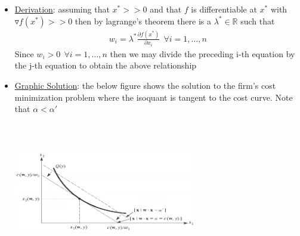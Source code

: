 \documentclass{article}
\begin{document}
  \begin{itemize}
    \item  \underline{Derivation}: assuming that $x^{*} >> 0$ and that $f$ is differentiable at $x^{*}$ with $\triangledown f(x^{*}) >> 0$ then by lagrange's theorem there is a $\lambda^{*} \in \mathbb{R}$ such that
    \begin{gather*}
      w_{i} = \lambda^{*} \frac{\partial f(x^{*})}{\partial x_{i}} \ \ \forall i = 1, \dots, n
    \end{gather*}
    Since $w_{i} > 0 \ \ \forall i = 1, \dots, n$ then we may divide the preceding i-th equation by the j-th equation to obtain the above relationship
    \item  \underline{Graphic Solution}: the below figure shows the solution to the firm's cost minimization problem where the isoquant is tangent to the cost curve. Note that $\alpha < \alpha'$ \\
    \begin{center}
      \includegraphics[width=8cm, height=6cm]{pic29}
    \end{center}
  \end{itemize}
  \par
\vspace{6mm}
\end{document}

